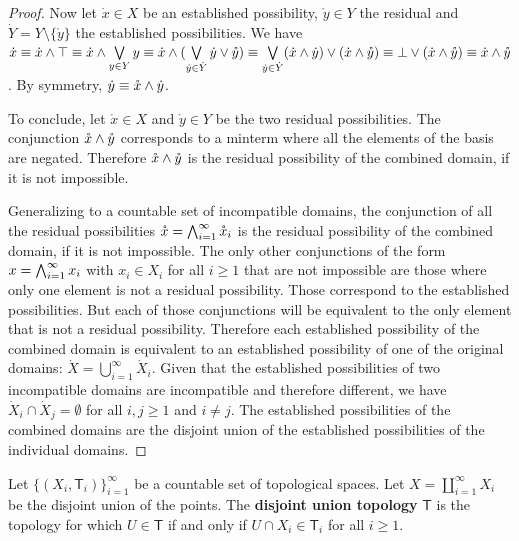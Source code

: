 \begin{mathSection}
\begin{proof}
		Now let $\dot{x} \in X$ be an established possibility, $\mathring{y} \in Y$ the residual and $\dot{Y} = Y \setminus \{\mathring{y}\}$ the established possibilities. We have $\dot{x} \equiv \dot{x} \wedge \top \equiv \dot{x} \wedge \bigvee\limits_{y \in Y} y \equiv \dot{x} \wedge (\bigvee\limits_{\dot{y} \in \dot{Y}} \dot{y} \vee \mathring{y}) \equiv \bigvee\limits_{\dot{y} \in \dot{Y}} (\dot{x} \wedge \dot{y}) \vee (\dot{x} \wedge \mathring{y}) \equiv \bot \vee (\dot{x} \wedge \mathring{y}) \equiv \dot{x} \wedge \mathring{y}$. By symmetry, $\dot{y} \equiv \mathring{x} \wedge \dot{y}$.
		
		To conclude, let $\mathring{x} \in X$ and $\mathring{y} \in Y$ be the two residual possibilities. The conjunction $\mathring{x} \wedge \mathring{y}$ corresponds to a minterm where all the elements of the basis are negated. Therefore $\mathring{x} \wedge \mathring{y}$ is the residual possibility of the combined domain, if it is not impossible. 
		
		Generalizing to a countable set of incompatible domains, the conjunction of all the residual possibilities $\mathring{x}= \bigwedge_{i=1}^{\infty} \mathring{x}_i$ is the residual possibility of the combined domain, if it is not impossible. The only other conjunctions of the form $x= \bigwedge_{i=1}^{\infty} x_i$ with $x_i \in X_i$ for all $i \geq 1$ that are not impossible are those where only one element is not a residual possibility. Those correspond to the established possibilities. But each of those conjunctions will be equivalent to the only element that is not a residual possibility. Therefore each established possibility of the combined domain is equivalent to an established possibility of one of the original domains: $\dot{X} = \bigcup\limits_{i=1}^{\infty} \dot{X}_i$. Given that the established possibilities of two incompatible domains are incompatible and therefore different, we have $\dot{X}_i \cap \dot{X}_j = \emptyset$ for all $i,j \geq 1$ and $i \neq j$. The established possibilities of the combined domains are the disjoint union of the established possibilities of the individual domains.
	\end{proof}
	
	\begin{defn}
		Let $\{(X_i, \mathsf{T}_i)\}_{i=1}^{\infty}$ be a countable set of topological spaces. Let $X=\coprod\limits_{i=1}^{\infty} X_i$ be the disjoint union of the points. The \textbf{disjoint union topology} $\mathsf{T}$ is the topology for which $U \in \mathsf{T}$ if and only if $U \cap X_i \in \mathsf{T}_i$ for all $i \geq 1$.
	\end{defn}
	

\end{mathSection}
